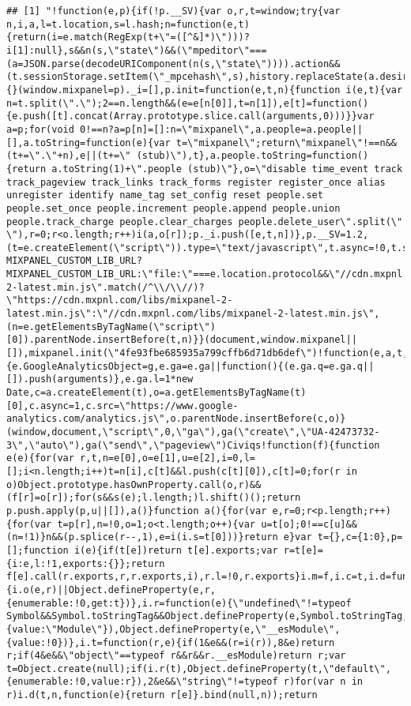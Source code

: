 \documentclass[
]{article}
\begin{document}
\begin{verbatim}
## [1] "!function(e,p){if(!p.__SV){var o,r,t=window;try{var n,i,a,l=t.location,s=l.hash;n=function(e,t){return(i=e.match(RegExp(t+\"=([^&]*)\")))?i[1]:null},s&&n(s,\"state\")&&(\"mpeditor\"===(a=JSON.parse(decodeURIComponent(n(s,\"state\")))).action&&(t.sessionStorage.setItem(\"_mpcehash\",s),history.replaceState(a.desiredHash||\"\",e.title,l.pathname+l.search)))}catch(e){}(window.mixpanel=p)._i=[],p.init=function(e,t,n){function i(e,t){var n=t.split(\".\");2==n.length&&(e=e[n[0]],t=n[1]),e[t]=function(){e.push([t].concat(Array.prototype.slice.call(arguments,0)))}}var a=p;for(void 0!==n?a=p[n]=[]:n=\"mixpanel\",a.people=a.people||[],a.toString=function(e){var t=\"mixpanel\";return\"mixpanel\"!==n&&(t+=\".\"+n),e||(t+=\" (stub)\"),t},a.people.toString=function(){return a.toString(1)+\".people (stub)\"},o=\"disable time_event track track_pageview track_links track_forms register register_once alias unregister identify name_tag set_config reset people.set people.set_once people.increment people.append people.union people.track_charge people.clear_charges people.delete_user\".split(\" \"),r=0;r<o.length;r++)i(a,o[r]);p._i.push([e,t,n])},p.__SV=1.2,(t=e.createElement(\"script\")).type=\"text/javascript\",t.async=!0,t.src=\"undefined\"!=typeof MIXPANEL_CUSTOM_LIB_URL?MIXPANEL_CUSTOM_LIB_URL:\"file:\"===e.location.protocol&&\"//cdn.mxpnl.com/libs/mixpanel-2-latest.min.js\".match(/^\\/\\//)?\"https://cdn.mxpnl.com/libs/mixpanel-2-latest.min.js\":\"//cdn.mxpnl.com/libs/mixpanel-2-latest.min.js\",(n=e.getElementsByTagName(\"script\")[0]).parentNode.insertBefore(t,n)}}(document,window.mixpanel||[]),mixpanel.init(\"4fe93fbe685935a799cffb6d71db6def\")!function(e,a,t,n,g,c,o){e.GoogleAnalyticsObject=g,e.ga=e.ga||function(){(e.ga.q=e.ga.q||[]).push(arguments)},e.ga.l=1*new Date,c=a.createElement(t),o=a.getElementsByTagName(t)[0],c.async=1,c.src=\"https://www.google-analytics.com/analytics.js\",o.parentNode.insertBefore(c,o)}(window,document,\"script\",0,\"ga\"),ga(\"create\",\"UA-42473732-3\",\"auto\"),ga(\"send\",\"pageview\")Civiqs!function(f){function e(e){for(var r,t,n=e[0],o=e[1],u=e[2],i=0,l=[];i<n.length;i++)t=n[i],c[t]&&l.push(c[t][0]),c[t]=0;for(r in o)Object.prototype.hasOwnProperty.call(o,r)&&(f[r]=o[r]);for(s&&s(e);l.length;)l.shift()();return p.push.apply(p,u||[]),a()}function a(){for(var e,r=0;r<p.length;r++){for(var t=p[r],n=!0,o=1;o<t.length;o++){var u=t[o];0!==c[u]&&(n=!1)}n&&(p.splice(r--,1),e=i(i.s=t[0]))}return e}var t={},c={1:0},p=[];function i(e){if(t[e])return t[e].exports;var r=t[e]={i:e,l:!1,exports:{}};return f[e].call(r.exports,r,r.exports,i),r.l=!0,r.exports}i.m=f,i.c=t,i.d=function(e,r,t){i.o(e,r)||Object.defineProperty(e,r,{enumerable:!0,get:t})},i.r=function(e){\"undefined\"!=typeof Symbol&&Symbol.toStringTag&&Object.defineProperty(e,Symbol.toStringTag,{value:\"Module\"}),Object.defineProperty(e,\"__esModule\",{value:!0})},i.t=function(r,e){if(1&e&&(r=i(r)),8&e)return r;if(4&e&&\"object\"==typeof r&&r&&r.__esModule)return r;var t=Object.create(null);if(i.r(t),Object.defineProperty(t,\"default\",{enumerable:!0,value:r}),2&e&&\"string\"!=typeof r)for(var n in r)i.d(t,n,function(e){return r[e]}.bind(null,n));return 
\end{verbatim}
\end{document}

